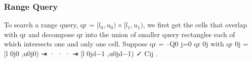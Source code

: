 \subsubsection{Range Query}
To search a range query, qr = $[l_{0},u_{0})\times[l_{1},u_{1})$, we first get the cells that overlap with qr and decompose qr
into the union of smaller query rectangles each of which
intersects one and only one cell. Suppose qr =
–Q0
j=0 qr 0j
with qr 0j = [l 0j0 ,u0j0) ⇥ · · · ⇥ [l 0jd−1 ,u0jd−1) ✓ Cij .
























